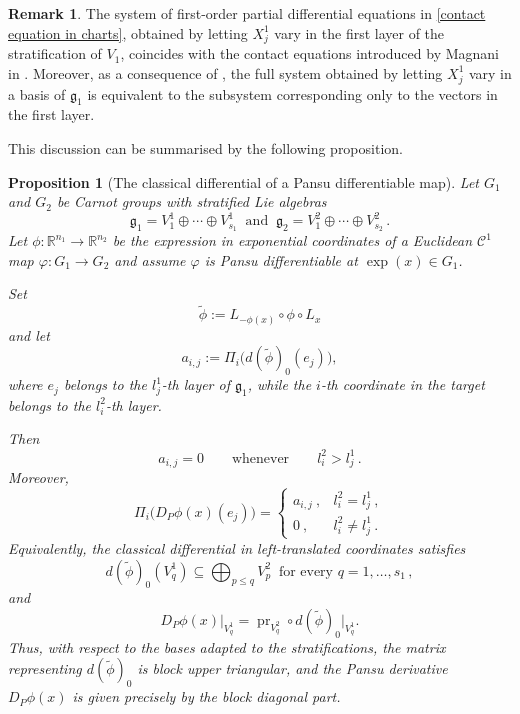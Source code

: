 \documentclass[dvipsnames]{amsart}
\newtheorem{proposition}[theorem]{Proposition}
\theoremstyle{definition}
\newtheorem{remark}[theorem]{Remark}
\theoremstyle{definition}
\numberwithin{equation}{section}
\begin{document}
\begin{remark}
The system of first-order partial differential equations in 
\eqref{contact equation in charts}, obtained by letting $X_j^1$ vary in the first layer of the stratification of $V_1$, coincides with the contact equations introduced by Magnani in \cite[Theorem 1.1]{Magnani_2013}.
Moreover, as a consequence of \cite[Theorem 1.1]{Magnani_2013}, the full system obtained by letting $X_j^1$ vary in a basis of $\mathfrak g_1$ is equivalent to the subsystem corresponding only to the vectors in the first layer.
\end{remark}
This discussion can be summarised by the following proposition.
\begin{proposition}[The classical differential of a Pansu differentiable map]
\label{prop:triangularity-classical-differential}
Let \(G_1\) and \(G_2\) be Carnot groups with stratified Lie algebras
\[
\mathfrak g_1=V_1^1\oplus\cdots\oplus V_{s_1}^1
\ \text{ and }\ 
\mathfrak g_2=V_1^2\oplus\cdots\oplus V_{s_2}^2\,.
\]
Let $\phi\colon\mathbb R^{n_1}\longrightarrow\mathbb R^{n_2}$
be the expression in exponential coordinates of a Euclidean
\(\mathcal C^1\) map
\(\varphi:G_1\to G_2\) and assume \(\varphi\) is Pansu
differentiable at $\exp(x)\in G_1$.

Set
\[
\widetilde\phi
:=
L_{-\phi(x)}\circ\phi\circ L_x
\]
and let
\[
a_{i,j}
:=
\Pi_i\bigl(d(\widetilde\phi)_0(e_j)\bigr),
\]
where \(e_j\) belongs to the $l_j^1$-th layer of $\mathfrak{g}_1$, while
the \(i\)-th coordinate in the target belongs to the $l_i^2$-th layer.

Then
\[
a_{i,j}=0
\qquad\text{whenever}\qquad
l_i^2>l_j^1\,.
\]
Moreover,
\[
\Pi_i\bigl(D_P\phi(x)(e_j)\bigr)
=
\begin{cases}
a_{i,j}\ , & l_i^2=l_j^1\,,\\[2mm]
0\ ,       & l_i^2\neq l_j^1\,.
\end{cases}
\]
Equivalently, the classical differential in left-translated
coordinates satisfies
\[
d(\widetilde\phi)_0(V_q^1)
\subseteq
\bigoplus_{p\leq q}V_p^2\ \text{ for every }q=1,\ldots,s_1\,,
\] and
\[
D_P\phi(x)\big|_{V_q^1}
=
\operatorname{pr}_{V_q^2}
\circ d(\widetilde\phi)_0\big|_{V_q^1}.
\]
Thus, with respect to the bases adapted to the stratifications,
the matrix representing \(d(\widetilde\phi)_0\) is block upper
triangular, and the Pansu derivative \(D_P\phi(x)\) is given
precisely by the block diagonal part.
\end{proposition}
\end{document}
